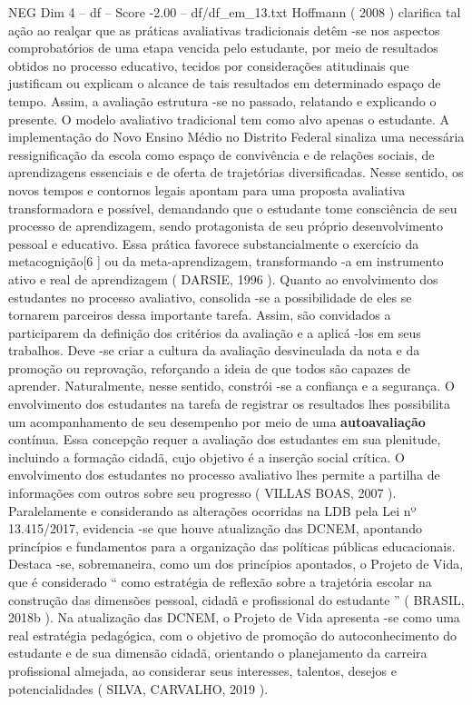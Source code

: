 \begin{textsample}{NEG Dim 4 – df – Score -2.00 – df/df\_em\_13.txt}
Hoffmann ( 2008 ) clarifica tal ação ao realçar que as práticas avaliativas tradicionais detêm -se nos aspectos comprobatórios de uma etapa vencida pelo estudante, por meio de resultados obtidos no processo educativo, tecidos por considerações atitudinais que justificam ou explicam o alcance de tais resultados em determinado espaço de tempo.
Assim, a avaliação estrutura -se no passado, relatando e explicando o presente.
O modelo avaliativo tradicional tem como alvo apenas o estudante.
A implementação do Novo Ensino Médio no Distrito Federal sinaliza uma necessária ressignificação da escola como espaço de convivência e de relações sociais, de aprendizagens essenciais e de oferta de trajetórias diversificadas.
Nesse sentido, os novos tempos e contornos legais apontam para uma proposta avaliativa transformadora e possível, demandando que o estudante tome consciência de seu processo de aprendizagem, sendo protagonista de seu próprio desenvolvimento pessoal e educativo.
Essa prática favorece substancialmente o exercício da metacognição[6 ] ou da meta-aprendizagem, transformando -a em instrumento ativo e real de aprendizagem ( DARSIE, 1996 ).
Quanto ao envolvimento dos estudantes no processo avaliativo, consolida -se a possibilidade de eles se tornarem parceiros dessa importante tarefa.
Assim, são convidados a participarem da definição dos critérios da avaliação e a aplicá -los em seus trabalhos.
Deve -se criar a cultura da avaliação desvinculada da nota e da promoção ou reprovação, reforçando a ideia de que todos são capazes de aprender.
Naturalmente, nesse sentido, constrói -se a confiança e a segurança.
O envolvimento dos estudantes na tarefa de registrar os resultados lhes possibilita um acompanhamento de seu desempenho por meio de uma \textbf{autoavaliação} contínua.
Essa concepção requer a avaliação dos estudantes em sua plenitude, incluindo a formação cidadã, cujo objetivo é a inserção social crítica.
O envolvimento dos estudantes no processo avaliativo lhes permite a partilha de informações com outros sobre seu progresso ( VILLAS BOAS, 2007 ).
Paralelamente e considerando as alterações ocorridas na LDB pela Lei nº 13.415/2017, evidencia -se que houve atualização das DCNEM, apontando princípios e fundamentos para a organização das políticas públicas educacionais.
Destaca -se, sobremaneira, como um dos princípios apontados, o Projeto de Vida, que é considerado “ como estratégia de reflexão sobre a trajetória escolar na construção das dimensões pessoal, cidadã e profissional do estudante ” ( BRASIL, 2018b ).
Na atualização das DCNEM, o Projeto de Vida apresenta -se como uma real estratégia pedagógica, com o objetivo de promoção do autoconhecimento do estudante e de sua dimensão cidadã, orientando o planejamento da carreira profissional almejada, ao considerar seus interesses, talentos, desejos e potencialidades ( SILVA, CARVALHO, 2019 ).

\end{textsample}

